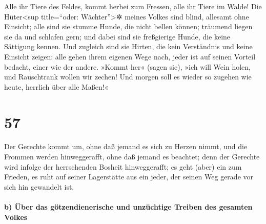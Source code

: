 Alle ihr Tiere des Feldes, kommt herbei zum Fressen, alle
ihr Tiere im Walde! Die Hüter\textless sup title=``oder:
Wächter''\textgreater✲ meines Volkes sind blind, allesamt ohne Einsicht;
alle sind sie stumme Hunde, die nicht bellen können; träumend liegen sie
da und schlafen gern; und dabei sind sie freßgierige
Hunde, die keine Sättigung kennen. Und zugleich sind sie Hirten, die
kein Verständnis und keine Einsicht zeigen: alle gehen ihrem eigenen
Wege nach, jeder ist auf seinen Vorteil bedacht, einer wie der andere.
»Kommt her« (sagen sie), »ich will Wein holen, und
Rauschtrank wollen wir zechen! Und morgen soll es wieder so zugehen wie
heute, herrlich über alle Maßen!«

\hypertarget{section-56}{%
\section{57}\label{section-56}}

Der Gerechte kommt um, ohne daß jemand es sich zu Herzen
nimmt, und die Frommen werden hinweggerafft, ohne daß jemand es
beachtet; denn der Gerechte wird infolge der herrschenden Bosheit
hinweggerafft; es geht (aber) ein zum Frieden, es ruht auf
seiner Lagerstätte aus ein jeder, der seinen Weg gerade vor sich hin
gewandelt ist.

\hypertarget{b-uxfcber-das-guxf6tzendienerische-und-unzuxfcchtige-treiben-des-gesamten-volkes}{%
\paragraph{b) Über das götzendienerische und unzüchtige Treiben des
gesamten
Volkes}\label{b-uxfcber-das-guxf6tzendienerische-und-unzuxfcchtige-treiben-des-gesamten-volkes}}

